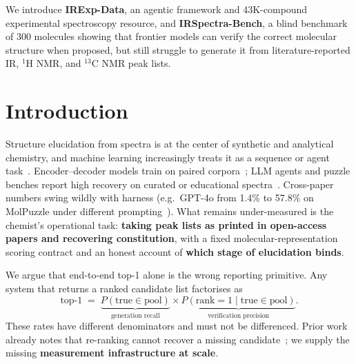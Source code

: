 \documentclass{article}
\begin{document}
We introduce \textbf{IRExp-Data}, an agentic framework and 43K-compound experimental spectroscopy resource, and \textbf{IRSpectra-Bench}, a blind benchmark of 300 molecules showing that frontier models can verify the correct molecular structure when proposed, but still struggle to generate it from literature-reported IR, $^1$H NMR, and $^{13}$C NMR peak lists.

\section{Introduction}
\label{sec:introduction}
Structure elucidation from spectra is at the center of synthetic and analytical chemistry,
and machine learning increasingly treats it as a sequence or agent task~\citep{guo2025aispectroscopy,westermayr2025mlspectroscopy}.
Encoder--decoder models train on paired corpora~\citep{chacko2024spectro,ottomano2025nmiracle,alberts2024ir};
LLM agents and puzzle benches report high recovery on curated or educational
spectra~\citep{guo2024molpuzzle,zhuang2025treesearch,espejo2026agentic}.
Cross-paper numbers swing wildly with harness (e.g.\ GPT-4o from 1.4\% to 57.8\% on MolPuzzle
under different prompting~\citep{guo2024molpuzzle,zhuang2025treesearch}).
What remains under-measured is the chemist's operational task: \textbf{taking peak lists as
printed in open-access papers and recovering constitution}, with a fixed molecular-representation
scoring contract and an honest account of \textbf{which stage of elucidation binds}.

We argue that end-to-end top-1 alone is the wrong reporting primitive.
Any system that returns a ranked candidate list factorises as
\begin{equation}
\text{top-1} \;=\; \underbrace{P(\text{true} \in \text{pool})}_{\text{generation recall}}
\times
\underbrace{P(\text{rank}=1 \mid \text{true} \in \text{pool})}_{\text{verification precision}}.
\end{equation}
These rates have different denominators and must not be differenced.
Prior work already notes that re-ranking cannot recover a missing
candidate~\citep{priessner2026reasoning,schymanski2017casmi,elyashberg2021acdse}; we supply the missing \textbf{measurement
infrastructure at scale}.
\end{document}
